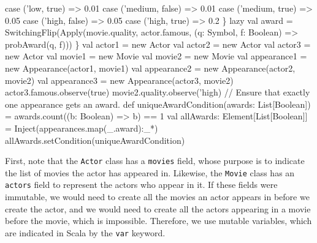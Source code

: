 \begin{flushleft}
{\newline \tab \tab case ('low, true) => 0.01
\newline \tab \tab case ('medium, false) => 0.01
\newline \tab \tab case ('medium, true) => 0.05
\newline \tab \tab case ('high, false) => 0.05
\newline \tab \tab case ('high, true) => 0.2
\newline \tab \tab \}
\newline \tab lazy val award = SwitchingFlip(Apply(movie.quality, actor.famous, (q: Symbol, f: Boolean) => probAward(q, f)))
\newline \}
\newline 
\newline val actor1 = new Actor 
\newline val actor2 = new Actor 
\newline val actor3 = new Actor 
\newline val movie1 = new Movie 
\newline val movie2 = new Movie
\newline val appearance1 = new Appearance(actor1, movie1)
\newline val appearance2 = new Appearance(actor2, movie2) 
\newline val appearance3 = new Appearance(actor3, movie2) 
\newline actor3.famous.observe(true) 
\newline movie2.quality.observe('high)
\newline 
\newline // Ensure that exactly one appearance gets an award. 
\newline def uniqueAwardCondition(awards: List[Boolean]) =
\newline \tab awards.count((b: Boolean) => b) == 1 
\newline val allAwards: Element[List[Boolean]] =
\newline \tab Inject(appearances.map(\_.award):\_*)
\newline allAwards.setCondition(uniqueAwardCondition)
}
\end{flushleft}

First, note that the \texttt{Actor} class has a \texttt{movies} field, whose purpose is to indicate the list of movies the actor has appeared in. Likewise, the \texttt{Movie} class has an \texttt{actors} field to represent the actors who appear in it. If these fields were immutable, we would need to create all the movies an actor appears in before we create the actor, and we would need to create all the actors appearing in a movie before the movie, which is impossible. Therefore, we use mutable variables, which are indicated in Scala by the \texttt{var} keyword.

